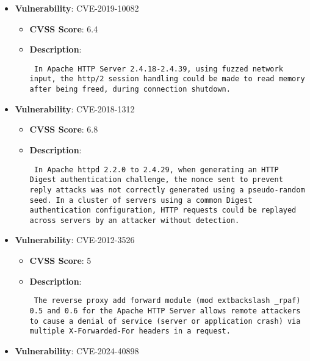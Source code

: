 \documentclass{article}
\begin{document}
\begin{itemize}
        \item \textbf{Vulnerability}: CVE-2019-10082
        \begin{itemize}
            \item \textbf{CVSS Score}:  6.4 
            \item \textbf{Description}: \parbox{\linewidth}{\texttt{ In Apache HTTP Server 2.4.18-2.4.39, using fuzzed network input, the http/2 session handling could be made to read memory after being freed, during connection shutdown. }}
        \end{itemize}
    
        \item \textbf{Vulnerability}: CVE-2018-1312
        \begin{itemize}
            \item \textbf{CVSS Score}:  6.8 
            \item \textbf{Description}: \parbox{\linewidth}{\texttt{ In Apache httpd 2.2.0 to 2.4.29, when generating an HTTP Digest authentication challenge, the nonce sent to prevent reply attacks was not correctly generated using a pseudo-random seed. In a cluster of servers using a common Digest authentication configuration, HTTP requests could be replayed across servers by an attacker without detection. }}
        \end{itemize}
    
        \item \textbf{Vulnerability}: CVE-2012-3526
        \begin{itemize}
            \item \textbf{CVSS Score}:  5 
            \item \textbf{Description}: \parbox{\linewidth}{\texttt{ The reverse proxy add forward module (mod	extbackslash _rpaf) 0.5 and 0.6 for the Apache HTTP Server allows remote attackers to cause a denial of service (server or application crash) via multiple X-Forwarded-For headers in a request. }}
        \end{itemize}
    
        \item \textbf{Vulnerability}: CVE-2024-40898
\end{itemize}
\end{document}

